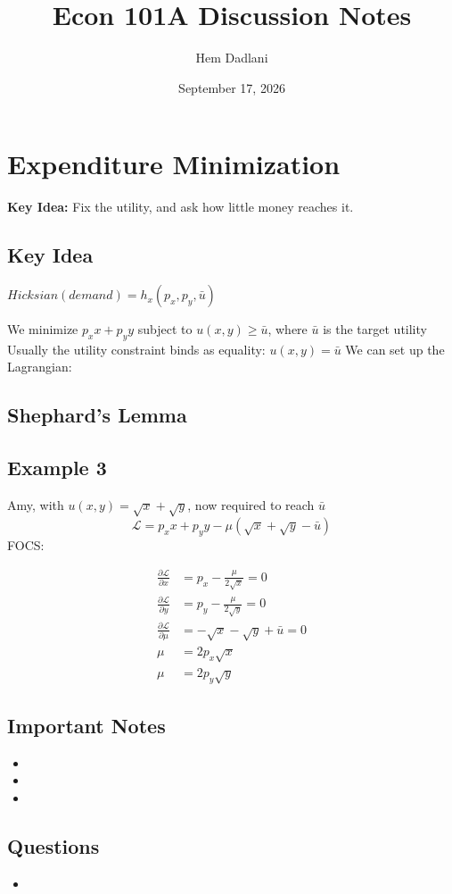 \documentclass[11pt]{article}
\title{Econ 101A Discussion Notes}
\author{Hem Dadlani}
\date{September 17, 2026}
\newcommand{\topic}[1]{\section*{#1}}
\newcommand{\subtopic}[1]{\subsection*{#1}}
\begin{document}
\maketitle

\topic{Expenditure Minimization}
\textbf{Key Idea: }Fix the utility, and ask how little money reaches it.
\subtopic{Key Idea}

$Hicksian (demand) = h_x (p_x,p_y,\bar{u})$

We minimize $p_xx + p_yy$ subject to $u(x,y) \geq \bar{u}$, where $\bar{u}$ is the target utility
Usually the utility constraint binds as equality: 
$u(x,y) = \bar{u}$
We can set up the Lagrangian: 


\subtopic{Shephard's Lemma}

\subtopic{Example 3}{
    Amy, with $u(x,y) = \sqrt{x} + \sqrt{y}$, now required to reach $\bar{u}$\\
    $$\mathcal{L} = p_xx + p_yy - \mu(\sqrt{x}+\sqrt{y}-\bar{u})
    $$
    FOCS:
    
            \[
        \begin{aligned}
        \frac{\partial\mathcal{L}}{\partial x}
        &= p_x - \frac{\mu}{2\sqrt{x}} = 0 \\
        \frac{\partial\mathcal{L}}{\partial y}
        &= p_y - \frac{\mu}{2\sqrt{y}} = 0 \\
        \frac{\partial\mathcal{L}}{\partial \mu}
        &= -\sqrt{x}-\sqrt{y}+\bar{u}=0 \\
        \mu &= 2p_x\sqrt{x} \\
        \mu &= 2p_y\sqrt{y}
        \end{aligned}
        \]
    
    

}
\subtopic{Important Notes}

\begin{itemize}
    \item 
    \item 
    \item 
\end{itemize}

\subtopic{Questions}

\begin{itemize}
    \item 
\end{itemize}
\end{document}
